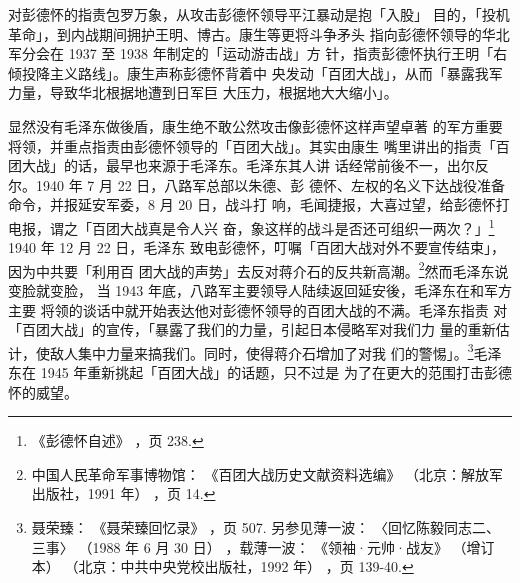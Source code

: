 对彭德怀的指责包罗万象，从攻击彭德怀领导平江暴动是抱「入股」
目的，「投机革命」，到内战期间拥护王明、博古。康生等更将斗争矛头
指向彭德怀领导的华北军分会在 1937 至 1938 年制定的「运动游击战」方
针，指责彭德怀执行王明「右倾投降主义路线」。康生声称彭德怀背着中
央发动「百团大战」，从而「暴露我军力量，导致华北根据地遭到日军巨
大压力，根据地大大缩小」。

显然没有毛泽东做後盾，康生绝不敢公然攻击像彭德怀这样声望卓著
的军方重要将领，并重点指责由彭德怀领导的「百团大战」。其实由康生
嘴里讲出的指责「百团大战」的话，最早也来源于毛泽东。毛泽东其人讲
话经常前後不一，出尔反尔。1940 年 7 月 22 日，八路军总部以朱德、彭
德怀、左权的名义下达战役准备命令，并报延安军委，8 月 20 日，战斗打
响，毛闻捷报，大喜过望，给彭德怀打电报，谓之「百团大战真是令人兴
奋，象这样的战斗是否还可组织一两次？」\footnote{《彭德怀自述》
，页 238.} 1940 年 12 月 22 日，毛泽东
致电彭德怀，叮嘱「百团大战对外不要宣传结束」，因为中共要「利用百
团大战的声势」去反对蒋介石的反共新高潮。\footnote{中国人民革命军事博物馆：
《百团大战历史文献资料选编》
（北京：解放军出版社，1991 年）
，页 14.}然而毛泽东说变脸就变脸，
当 1943 年底，八路军主要领导人陆续返回延安後，毛泽东在和军方主要
将领的谈话中就开始表达他对彭德怀领导的百团大战的不满。毛泽东指责
对「百团大战」的宣传，「暴露了我们的力量，引起日本侵略军对我们力
量的重新估计，使敌人集中力量来搞我们。同时，使得蒋介石增加了对我
们的警惕」。\footnote{聂荣臻：
《聂荣臻回忆录》
，页 507. 另参见薄一波：
〈回忆陈毅同志二、三事〉
（1988 年 6 月 30 日）
，载薄一波：
《领袖·元帅·战友》
（增订本）
（北京：中共中央党校出版社，1992 年）
，页 139-40. 
 }毛泽东在 1945 年重新挑起「百团大战」的话题，只不过是
为了在更大的范围打击彭德怀的威望。

